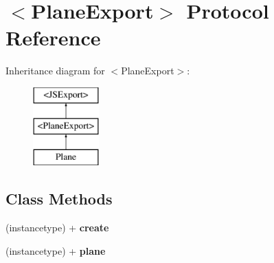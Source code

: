 \hypertarget{protocol_plane_export-p}{}\section{$<$Plane\+Export$>$ Protocol Reference}
\label{protocol_plane_export-p}
Inheritance diagram for $<$Plane\+Export$>$\+:\begin{figure}[H]
\begin{center}
\leavevmode
\includegraphics[height=3.000000cm]{protocol_plane_export-p}
\end{center}
\end{figure}
\subsection*{Class Methods}
\begin{DoxyCompactItemize}
\item 
\hypertarget{protocol_plane_export-p_a364af68f1660563662d026503f177a37}{}(instancetype) + {\bfseries create}\label{protocol_plane_export-p_a364af68f1660563662d026503f177a37}

\item 
\hypertarget{protocol_plane_export-p_a29b5e969c1850eb9caba5de32084c5f6}{}(instancetype) + {\bfseries plane}\label{protocol_plane_export-p_a29b5e969c1850eb9caba5de32084c5f6}

\end{DoxyCompactItemize}
